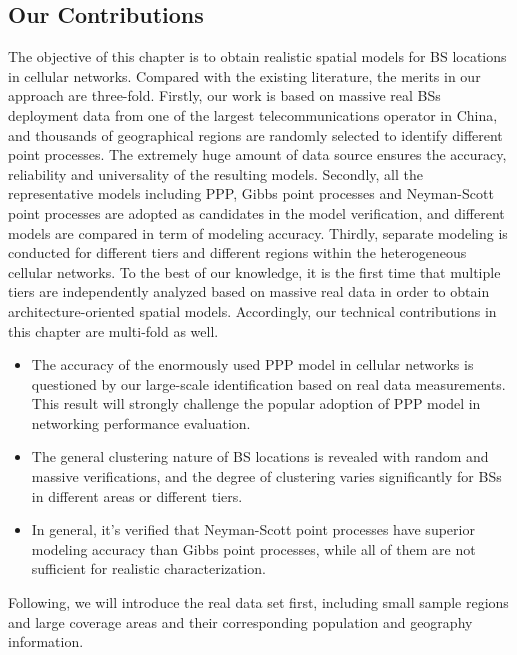 \subsection*{Our Contributions}
The objective of this chapter is to obtain realistic spatial models for BS locations in cellular networks. Compared with the existing literature, the merits in our approach are three-fold. Firstly, our work is based on massive real BSs deployment data from one of the largest telecommunications operator in China, and thousands of geographical regions are randomly selected to identify different point processes. The extremely huge amount of data source ensures the accuracy, reliability and universality of the resulting models. Secondly, all the representative models including PPP, Gibbs point processes and Neyman-Scott point processes are adopted as candidates in the model verification, and different models are compared in term of modeling accuracy. Thirdly, separate modeling is conducted for different tiers and different regions within the heterogeneous cellular networks. To the best of our knowledge, it is the first time that multiple tiers are independently analyzed based on massive real data in order to obtain architecture-oriented spatial models.
Accordingly, our technical contributions in this chapter are multi-fold as well.
\begin{itemize}
\item The accuracy of the enormously used PPP model in cellular networks is questioned by our large-scale identification based on real data measurements. This result will strongly challenge the popular adoption of PPP model in networking performance evaluation.
\item The general clustering nature of BS locations is revealed with random and massive verifications, and the degree of clustering varies significantly for BSs in different areas or different tiers.
\item In general, it's verified that Neyman-Scott point processes have superior modeling accuracy than Gibbs point processes, while all of them are not sufficient for realistic characterization.
\end{itemize}

Following, we will introduce the real data set first, including small sample regions and large coverage areas and their corresponding population and geography information.
